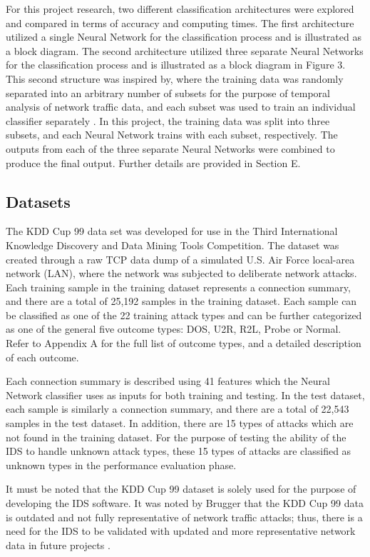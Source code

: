 \documentclass[12pt]{article}
\theoremstyle{definition}
\begin{document}
		For this project research, two different classification architectures were explored and compared in terms of accuracy and computing times. The first architecture utilized a single Neural Network for the classification process and is illustrated as a block diagram. The second architecture utilized three separate Neural Networks for the classification process and is illustrated as a block diagram in Figure 3. This second structure was inspired by, where the training data was randomly separated into an arbitrary number of subsets for the purpose of temporal analysis of network traffic data, and each subset was used to train an individual classifier separately \cite{Shamshirband2014}. In this project, the training data was split into three subsets, and each Neural Network trains with each subset, respectively. The outputs from each of the three separate Neural Networks were combined to produce the final output. Further details are provided in Section E.
		
		\subsection{Datasets}
		
		The KDD Cup 99 data set was developed for use in the Third International Knowledge Discovery and Data Mining Tools Competition. The dataset was created through a raw TCP data dump of a simulated U.S. Air Force local-area network (LAN), where the network was subjected to deliberate network attacks.
		Each training sample in the training dataset represents a connection summary, and there are a total of 25,192 samples in the training dataset. Each sample can be classified as one of the 22 training attack types and can be further categorized as one of the general five outcome types: DOS, U2R, R2L, Probe or Normal. Refer to Appendix A for the full list of outcome types, and a detailed description of each outcome.
		
		Each connection summary is described using 41 features which the Neural Network classifier uses as inputs for both training and testing. In the test dataset, each sample is similarly a connection summary, and there are a total of 22,543 samples in the test dataset. In addition, there are 15 types of attacks which are not found in the training dataset. For the purpose of testing the ability of the IDS to handle unknown attack types, these 15 types of attacks are classified as unknown types in the performance evaluation phase.
				
		It must be noted that the KDD Cup 99 dataset is solely used for the purpose of developing the IDS software. It was noted by Brugger that the KDD Cup 99 data is outdated and not fully representative of network traffic attacks; thus, there is a need for the IDS to be validated with updated and more representative network data in future projects \citealp{Shamshirband2014}.
		
\end{document}
